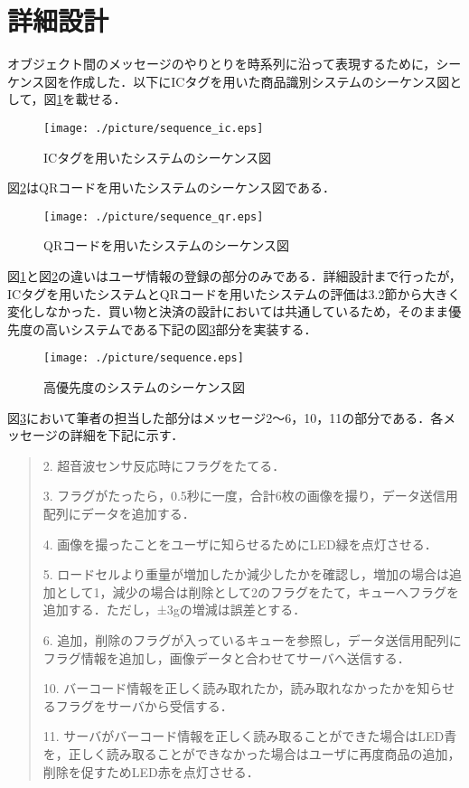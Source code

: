 

\section{詳細設計}

オブジェクト間のメッセージのやりとりを時系列に沿って表現するために，シーケンス図を作成した．以下にICタグを用いた商品識別システムのシーケンス図として，図\ref{sequence_ic}を載せる．

\begin{figure}[htbp]
\centering
\texttt{[image: ./picture/sequence\_ic.eps]}
\caption{ICタグを用いたシステムのシーケンス図}
\label{sequence_ic}
\end{figure}


図\ref{sequence_qr}はQRコードを用いたシステムのシーケンス図である．


\begin{figure}[htbp]
\centering
\texttt{[image: ./picture/sequence\_qr.eps]}
\caption{QRコードを用いたシステムのシーケンス図}
\label{sequence_qr}
\end{figure}


図\ref{sequence_ic}と図\ref{sequence_qr}の違いはユーザ情報の登録の部分のみである．詳細設計まで行ったが，ICタグを用いたシステムとQRコードを用いたシステムの評価は3.2節から大きく変化しなかった．買い物と決済の設計においては共通しているため，そのまま優先度の高いシステムである下記の図\ref{sequence}部分を実装する．



\begin{figure}[htbp]
\centering
\texttt{[image: ./picture/sequence.eps]}
\caption{高優先度のシステムのシーケンス図}
\label{sequence}
\end{figure}


図\ref{sequence}において筆者の担当した部分はメッセージ2～6，10，11の部分である．各メッセージの詳細を下記に示す．


\begin{quote}
2. 超音波センサ反応時にフラグをたてる．

3. フラグがたったら，0.5秒に一度，合計6枚の画像を撮り，データ送信用配列にデータを追加する．

4. 画像を撮ったことをユーザに知らせるためにLED緑を点灯させる．

5. ロードセルより重量が増加したか減少したかを確認し，増加の場合は追加として1，減少の場合は削除として2のフラグをたて，キューへフラグを追加する．ただし，±3gの増減は誤差とする．

6. 追加，削除のフラグが入っているキューを参照し，データ送信用配列にフラグ情報を追加し，画像データと合わせてサーバへ送信する．

10. バーコード情報を正しく読み取れたか，読み取れなかったかを知らせるフラグをサーバから受信する．

11. サーバがバーコード情報を正しく読み取ることができた場合はLED青を，正しく読み取ることができなかった場合はユーザに再度商品の追加，削除を促すためLED赤を点灯させる．
\end{quote}


